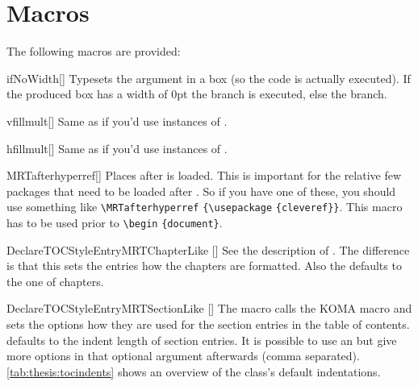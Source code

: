\section{Macros}\label{sec:thesis:mac}%
The following macros are provided:
\begin{describemacroTF}{ifNoWidth}[]
  Typesets the argument in a box (so the code is actually executed). If the
  produced box has a width of 0pt the  branch is executed, else the
   branch.
\end{describemacroTF}
\begin{describemacro}{vfillmult}[]
  Same as if you'd use  instances of .
\end{describemacro}
\begin{describemacro}{hfillmult}[]
  Same as if you'd use  instances of .
\end{describemacro}
\begin{describemacro}{MRTafterhyperref}[]
  Places  after  is loaded. This is important for
  the relative few packages that need to be loaded after . So if
  you have one of these, you should use something like
  \verb|\MRTafterhyperref|\hskip0pt
  \verb|{\usepackage|\hskip0pt
  \verb|{cleveref}}|. This macro has to be used prior to
  \verb|\begin|\hskip0pt
  \verb|{document}|.
\end{describemacro}
\begin{describemacro}{DeclareTOCStyleEntryMRTChapterLike}%
  [\hskip0pt]
  See the description of . The difference
  is that this sets the entries how the chapters are formatted. Also the
   defaults to the one of chapters.
\end{describemacro}
\begin{describemacro}{DeclareTOCStyleEntryMRTSectionLike}%
  [\hskip0pt]
  The macro calls the KOMA macro  and sets the options
  how they are used for the section entries in the table of contents.
   defaults to the indent length of section entries. It is possible
  to use an  but give more options in that optional argument
  afterwards (comma separated). \autoref{tab:thesis:tocindents} shows an
  overview of the class's default indentations.
\end{describemacro}
